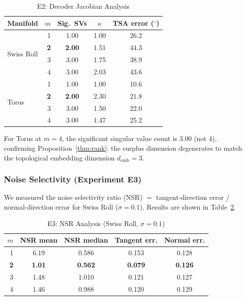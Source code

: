 \documentclass[lettersize,journal]{IEEEtran}
\newcommand{\kap}{\kappa}
\newcommand{\demb}{d_{\mathrm{emb}}}
\begin{document}
\begin{table}[!t]
\centering
\caption{E2: Decoder Jacobian Analysis}
\label{tab:e2}
\begin{tabular}{lrccc}
\toprule
Manifold & $m$ & Sig.\ SVs & $\kap$ & TSA error ($^\circ$) \\
\midrule
\multirow{4}{*}{Swiss Roll} & 1 & 1.00 & 1.00 & 26.2 \\
 & \textbf{2} & \textbf{2.00} & 1.51 & 44.3 \\
 & 3 & 3.00 & 1.75 & 38.9 \\
 & 4 & 3.00 & 2.03 & 43.6 \\
\midrule
\multirow{4}{*}{Torus} & 1 & 1.00 & 1.00 & 10.6 \\
 & \textbf{2} & \textbf{2.00} & 2.30 & 21.8 \\
 & 3 & 3.00 & 1.50 & 22.0 \\
 & 4 & 3.00 & 1.47 & 25.2 \\
\bottomrule
\end{tabular}
\end{table}

For Torus at $m=4$, the significant singular value count is 3.00 (not 4), confirming Proposition~\ref{thm:rank}: the surplus dimension degenerates to match the topological embedding dimension $\demb = 3$.

\subsubsection{Noise Selectivity (Experiment E3)}

We measured the noise selectivity ratio (NSR) $=$ tangent-direction error / normal-direction error for Swiss Roll ($\sigma = 0.1$).
Results are shown in Table~\ref{tab:e3}.

\begin{table}[!t]
\centering
\caption{E3: NSR Analysis (Swiss Roll, $\sigma=0.1$)}
\label{tab:e3}
\begin{tabular}{rcccc}
\toprule
$m$ & NSR mean & NSR median & Tangent err. & Normal err. \\
\midrule
1 & 6.19 & 0.586 & 0.153 & 0.128 \\
\textbf{2} & \textbf{1.01} & \textbf{0.562} & \textbf{0.079} & \textbf{0.126} \\
3 & 1.48 & 1.010 & 0.121 & 0.127 \\
4 & 1.46 & 0.988 & 0.120 & 0.129 \\
\bottomrule
\end{tabular}
\end{table}
\end{document}
